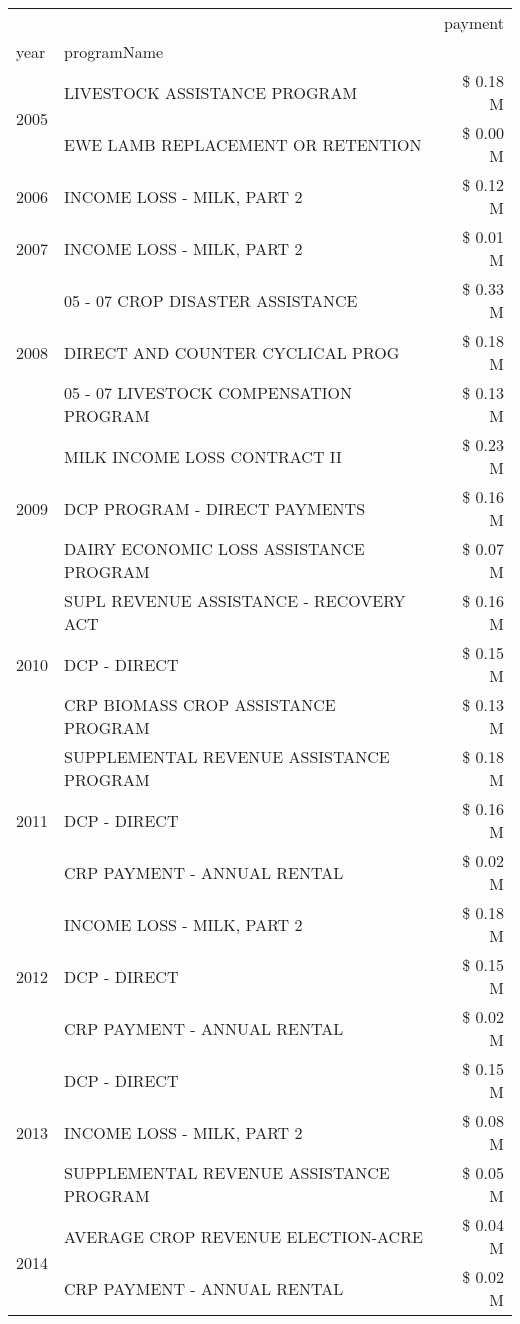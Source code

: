 \begin{tabular}{llr}
\toprule
 &  & payment \\
year & programName &  \\
\midrule
\multirow[t]{2}{*}{2005} & LIVESTOCK ASSISTANCE PROGRAM & \$ 0.18 M \\
 & EWE LAMB REPLACEMENT OR RETENTION & \$ 0.00 M \\
\cline{1-3}
2006 & INCOME LOSS - MILK, PART 2 & \$ 0.12 M \\
\cline{1-3}
2007 & INCOME LOSS - MILK, PART 2 & \$ 0.01 M \\
\cline{1-3}
\multirow[t]{3}{*}{2008} & 05 - 07 CROP DISASTER ASSISTANCE & \$ 0.33 M \\
 & DIRECT AND COUNTER CYCLICAL PROG & \$ 0.18 M \\
 & 05 - 07 LIVESTOCK COMPENSATION PROGRAM & \$ 0.13 M \\
\cline{1-3}
\multirow[t]{3}{*}{2009} & MILK INCOME LOSS CONTRACT II & \$ 0.23 M \\
 & DCP PROGRAM - DIRECT PAYMENTS & \$ 0.16 M \\
 & DAIRY ECONOMIC LOSS ASSISTANCE PROGRAM & \$ 0.07 M \\
\cline{1-3}
\multirow[t]{3}{*}{2010} & SUPL REVENUE ASSISTANCE - RECOVERY ACT & \$ 0.16 M \\
 & DCP - DIRECT & \$ 0.15 M \\
 & CRP BIOMASS CROP ASSISTANCE PROGRAM & \$ 0.13 M \\
\cline{1-3}
\multirow[t]{3}{*}{2011} & SUPPLEMENTAL REVENUE ASSISTANCE PROGRAM & \$ 0.18 M \\
 & DCP - DIRECT & \$ 0.16 M \\
 & CRP PAYMENT - ANNUAL RENTAL & \$ 0.02 M \\
\cline{1-3}
\multirow[t]{3}{*}{2012} & INCOME LOSS - MILK, PART 2 & \$ 0.18 M \\
 & DCP - DIRECT & \$ 0.15 M \\
 & CRP PAYMENT - ANNUAL RENTAL & \$ 0.02 M \\
\cline{1-3}
\multirow[t]{3}{*}{2013} & DCP - DIRECT & \$ 0.15 M \\
 & INCOME LOSS - MILK, PART 2 & \$ 0.08 M \\
 & SUPPLEMENTAL REVENUE ASSISTANCE PROGRAM & \$ 0.05 M \\
\cline{1-3}
\multirow[t]{3}{*}{2014} & AVERAGE CROP REVENUE ELECTION-ACRE & \$ 0.04 M \\
 & CRP PAYMENT - ANNUAL RENTAL & \$ 0.02 M \\

\end{tabular}

